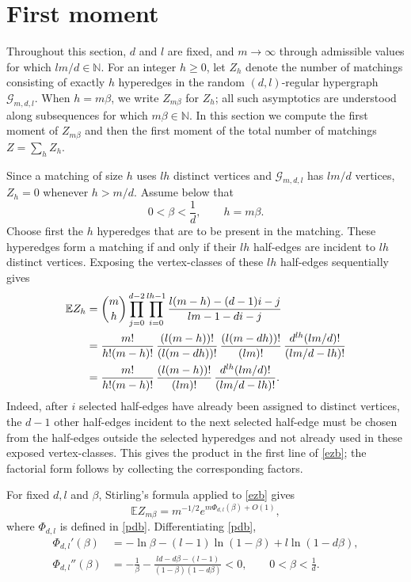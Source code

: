 \documentclass[11pt]{amsart}
\theoremstyle{plain}
\numberwithin{equation}{section}
\numberwithin{theorem}{section}
\numberwithin{figure}{section}
\begin{document}
\section{First moment}\label{fm}

Throughout this section, $d$ and $l$ are fixed, and $m\to\infty$ through admissible values for which $lm/d\in\mathbb{N}$.  For an integer $h\geq 0$, let $Z_h$ denote the number of matchings consisting of exactly $h$ hyperedges in the random $(d,l)$-regular hypergraph $\mathcal{G}_{m,d,l}$.  When $h=m\beta$, we write $Z_{m\beta}$ for $Z_h$; all such asymptotics are understood along subsequences for which $m\beta\in\mathbb{N}$.  In this section we compute the first moment of $Z_{m\beta}$ and then the first moment of the total number of matchings $Z=\sum_h Z_h$.

Since a matching of size $h$ uses $lh$ distinct vertices and $\mathcal{G}_{m,d,l}$ has $lm/d$ vertices, $Z_h=0$ whenever $h>m/d$.  Assume below that
\begin{equation}
0<\beta<\frac1d, \qquad h=m\beta .
\label{cd4}
\end{equation}
Choose first the $h$ hyperedges that are to be present in the matching.  These hyperedges form a matching if and only if their $lh$ half-edges are incident to $lh$ distinct vertices.  Exposing the vertex-classes of these $lh$ half-edges sequentially gives
\begin{align}
\mathbb{E}Z_h
&=\binom{m}{h}\prod_{j=0}^{d-2}\prod_{i=0}^{lh-1}
\frac{l(m-h)-(d-1)i-j}{lm-1-di-j}
\notag\\
&=\frac{m!}{h!(m-h)!}\,
  \frac{(l(m-h))!}{(l(m-dh))!}\,
  \frac{(l(m-dh))!}{(lm)!}\,
  \frac{d^{lh}(lm/d)!}{(lm/d-lh)!}  \notag\\
&=\frac{m!}{h!(m-h)!}\,
  \frac{(l(m-h))!}{(lm)!}\,
  \frac{d^{lh}(lm/d)!}{(lm/d-lh)!} .
\label{ezb}
\end{align}
Indeed, after $i$ selected half-edges have already been assigned to distinct vertices, the $d-1$ other half-edges incident to the next selected half-edge must be chosen from the half-edges outside the selected hyperedges and not already used in these exposed vertex-classes.  This gives the product in the first line of \eqref{ezb}; the factorial form follows by collecting the corresponding factors.

For fixed $d,l$ and $\beta$, Stirling's formula applied to \eqref{ezb} gives
\begin{equation}
\mathbb{E}Z_{m\beta}=m^{-1/2}e^{m\Phi_{d,l}(\beta)+O(1)},
\label{a1m}
\end{equation}
where $\Phi_{d,l}$ is defined in \eqref{pdb}.  Differentiating \eqref{pdb},
\begin{align}
\Phi_{d,l}'(\beta)
&=-\ln\beta-(l-1)\ln(1-\beta)+l\ln(1-d\beta),
\label{1dp}\\
\Phi_{d,l}''(\beta)
&=-\frac{1}{\beta}
  -\frac{ld-d\beta-(l-1)}{(1-\beta)(1-d\beta)}<0,
\qquad 0<\beta<\frac1d .
\label{2dp}
\end{align}
\end{document}
